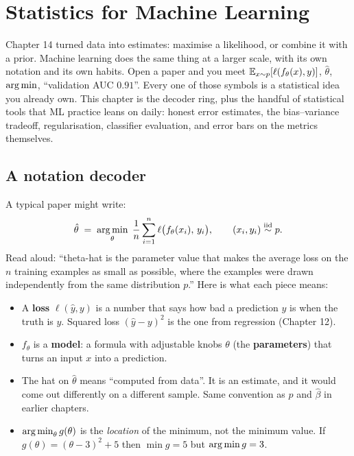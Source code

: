 \chapter{Statistics for Machine Learning}
\label{ch:stats-for-ml}

Chapter 14 turned data into estimates: maximise a likelihood, or combine it with a prior.
Machine learning does the same thing at a larger scale, with its own notation and its own
habits. Open a paper and you meet $\operatorname{\mathbb{E}}_{x\sim p}[\ell(f_\theta(x),y)]$, $\hat\theta$,
$\operatorname*{arg\,min}$, ``validation AUC $0.91$''. Every one of those symbols is a statistical idea you
already own. This chapter is the decoder ring, plus the handful of statistical tools that ML
practice leans on daily: honest error estimates, the bias--variance tradeoff, regularisation,
classifier evaluation, and error bars on the metrics themselves.

\section{A notation decoder}
\label{sec:ml-notation}

A typical paper might write:
\[
  \hat\theta \;=\; \operatorname*{arg\,min}_{\theta}\; \frac1n\sum_{i=1}^n \ell\big(f_\theta(x_i),\,y_i\big),
  \qquad (x_i,y_i)\overset{\text{iid}}{\sim} p .
\]
Read aloud: ``theta-hat is the parameter value that makes the average loss on the $n$
training examples as small as possible, where the examples were drawn independently from the
same distribution $p$.'' Here is what each piece means:

\begin{itemize}
  \item A \textbf{loss} $\ell(\hat y, y)$ is a number that says how bad a prediction $\hat y$
  is when the truth is $y$. Squared loss $(\hat y-y)^2$ is the one from regression (Chapter 12).
  \item $f_\theta$ is a \textbf{model}: a formula with adjustable knobs $\theta$ (the
  \textbf{parameters}) that turns an input $x$ into a prediction.
  \item The hat on $\hat\theta$ means ``computed from data''. It is an estimate, and it would
  come out differently on a different sample. Same convention as $\hat p$ and $\hat\beta$ in
  earlier chapters.
  \item $\operatorname*{arg\,min}_\theta g(\theta)$ is the \emph{location} of the minimum, not the minimum
  value. If $g(\theta)=(\theta-3)^2+5$ then $\min g = 5$ but $\operatorname*{arg\,min} g = 3$.
\end{itemize}

